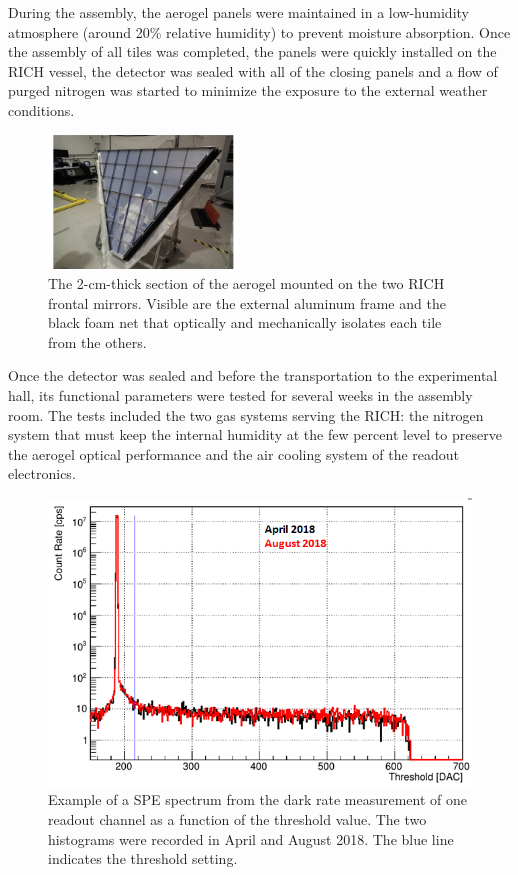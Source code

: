 \documentclass[5p,times,twocolumn]{elsarticle}
\begin{document}
During the assembly, the aerogel panels were maintained in a low-humidity atmosphere (around 20\% relative humidity)
to prevent moisture absorption. Once the assembly of all tiles was completed, the panels were quickly installed on
the RICH vessel, the detector was sealed with all of the closing panels and a flow of purged nitrogen was started to
minimize the exposure to the external weather conditions.

\begin{figure}
\begin{center}
\includegraphics[width=0.45\textwidth]{aerogel_bottom.pdf}
\caption{The 2-cm-thick section of the aerogel mounted on the two RICH frontal mirrors. Visible are the
  external aluminum frame and the black foam net that optically and mechanically isolates each tile from the others.}
\label{Fig:AeroB1}
\end{center}
\end{figure}

Once the detector was sealed and before the transportation to the experimental hall, its functional parameters were
tested for several weeks in the assembly room. The tests included the two gas systems serving the RICH: the nitrogen
system that must keep the internal humidity at the few percent level to preserve the aerogel optical performance and
the air cooling system of the readout electronics.

\begin{figure}[t]
\begin{center}
\includegraphics[width=1.0\columnwidth]{SPEdark.png}
\end{center}
\caption{Example of a SPE spectrum from the dark rate measurement of one readout channel as a function of the
  threshold value. The two histograms were recorded in April and August 2018. The blue line indicates the threshold
  setting.}
\label{fig:SPEdark}
\end{figure}
\end{document}
